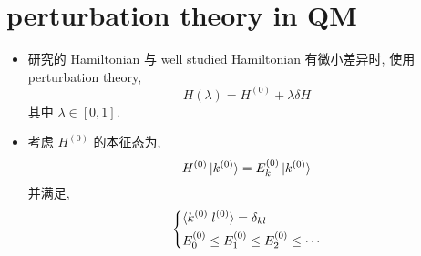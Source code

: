 \chapter{perturbation theory in QM}
\begin{itemize}
	\item 研究的 Hamiltonian 与 well studied Hamiltonian 有微小差异时, 使用 perturbation theory,
	\begin{equation}
		H(\lambda) = H^{(0)} + \lambda \delta H
	\end{equation}
	其中 $\lambda \in [0, 1]$.
	
	\item 考虑 $H^{(0)}$ 的本征态为,
	\begin{equation}
		H^{(0)} \ket{k^{(0)}} = E_k^{(0)} \ket{k^{(0)}}
	\end{equation}
	并满足,
	\begin{equation}
		\begin{dcases}
			\braket{k^{(0)} | l^{(0)}} = \delta_{k l} \\
			E_0^{(0)} \leq E_1^{(0)} \leq E_2^{(0)} \leq \cdots
		\end{dcases}
	\end{equation}
\end{itemize}

